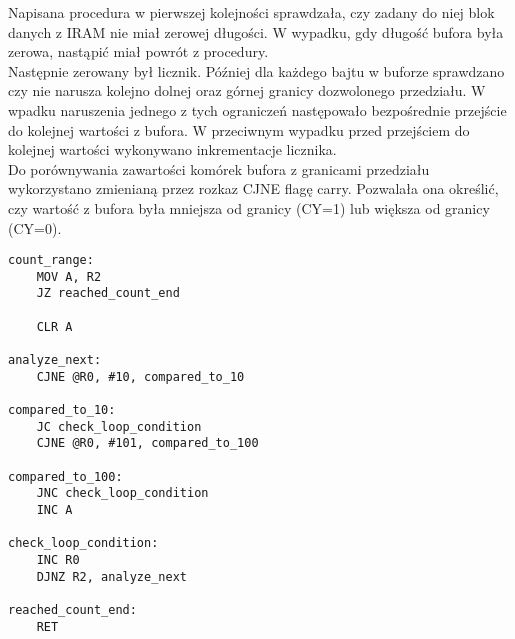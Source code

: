 \documentclass[a4paper,12pt]{article}
\begin{document}
\noindent
Napisana procedura w pierwszej kolejności sprawdzała, czy zadany do niej blok danych z IRAM nie miał zerowej długości. W wypadku, gdy długość bufora była zerowa, nastąpić miał powrót z procedury.\\

\noindent
Następnie zerowany był licznik. Później dla każdego bajtu w buforze sprawdzano czy nie narusza kolejno dolnej oraz górnej granicy dozwolonego przedziału. W wpadku naruszenia jednego z tych ograniczeń następowało bezpośrednie przejście do kolejnej wartości z bufora. W przeciwnym wypadku przed przejściem do kolejnej wartości wykonywano inkrementacje licznika.\\

\noindent
Do porównywania zawartości komórek bufora z granicami przedziału wykorzystano zmienianą przez rozkaz CJNE flagę carry. Pozwalała ona określić, czy wartość z bufora była mniejsza od granicy (CY=1) lub większa od granicy (CY=0).

\begin{lstlisting}[frame=single, basicstyle=\small, caption={Kod z zadania 5}, label={lst.zad4.2}]
count_range:
	MOV A, R2
	JZ reached_count_end
	
	CLR A

analyze_next:
	CJNE @R0, #10, compared_to_10

compared_to_10:
	JC check_loop_condition
	CJNE @R0, #101, compared_to_100

compared_to_100:
	JNC check_loop_condition
	INC A

check_loop_condition:
	INC R0
	DJNZ R2, analyze_next

reached_count_end:
	RET
\end{lstlisting}
\vspace{5mm}
\end{document}
